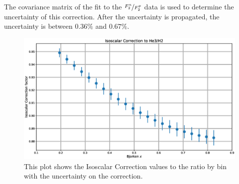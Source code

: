 The covariance matrix of the fit to the $\nicefrac{F_2^n}{F_2^p}$ data is used to determine the uncertainty of this correction. After the uncertainty is propagated, the uncertainty is between $0.36\%$ and $0.67\%$.

\begin{figure}
	\includegraphics[width=\textwidth]{./analysis/fig/isocor.eps}
	\caption{This plot shows the Isoscalar Correction values to the  ratio by bin with the uncertainty on the correction.}
\end{figure}



